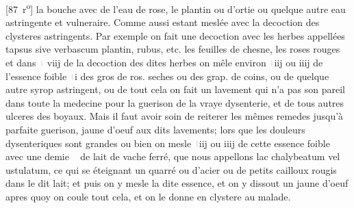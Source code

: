 [87~r\textsuperscript{o}]
la bouche avec de l'eau de rose, le plantin ou d'ortie ou quelque autre eau astringente et vulneraire. Comme aussi estant mesl\'{e}e avec la decoction des clysteres astringents. Par exemple on fait une decoction avec les herbes appell\'{e}es tapsus  sive verbascum plantin, rubus, etc. les feuilles de chesne, les roses rouges et dans \includegraphics[width=0.014\textwidth]{images/uncia.pdf} viij de la decoction des dites herbes on m\^{e}le environ \includegraphics[width=0.014\textwidth]{images/uncia.pdf}iij ou iiij de l'essence foible \includegraphics[width=0.014\textwidth]{images/uncia.pdf}i des gros de ros. seches ou des grap. de coins, ou de quelque autre syrop astringent, ou de tout cela on fait un lavement qui n'a pas son pareil dans toute la medecine pour la guerison de la vraye dysenterie, et de tous autres ulceres des boyaux. Mais il faut avoir soin de reiterer les m\^{e}mes remedes jusqu'\`{a}  parfaite guerison,
 jaune d'oeuf aux dits lavements; lors que les douleurs dysenteriques sont grandes ou bien on mesle \includegraphics[width=0.014\textwidth]{images/uncia.pdf}iij ou iiij de cette essence foible avec une demie \Pfund\ \hspace{-1.8mm} de lait de vache ferr\'{e}, que nous appellons lac chalybeatum vel ustulatum, ce qui se  \'{e}teignant un quarr\'{e} ou d'acier ou de petits cailloux rougis dans le dit lait; et puis on y mesle la dite essence, et on y dissout un jaune d'oeuf apres quoy on coule tout cela, et on le donne en clystere au malade. 
